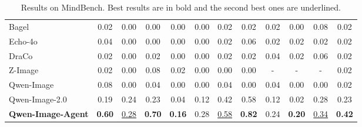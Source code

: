 \begin{table}[t]
{\begin{tabular}{l|ccccc|ccccc|c}
Bagel~\citep{deng2025bagel}                    & 0.02 & 0.00 & 0.00 & 0.00 & 0.00 & 0.02 & 0.02 & 0.02 & 0.00 & 0.08 & 0.02 \\
Echo-4o~\citep{ye2025echo}                     & 0.04 & 0.00 & 0.00 & 0.00 & 0.00 & 0.02 & 0.06 & 0.02 & 0.02 & 0.02 & 0.02 \\
DraCo~\citep{jiang2025draco}                   & 0.02 & 0.00 & 0.02 & 0.00 & 0.00 & 0.02 & 0.02 & 0.04 & 0.02 & 0.06 & 0.02 \\
Z-Image~\citep{cai2025z}                       & 0.02 & 0.00 & 0.08 & 0.02 & 0.00 & 0.00 & 0.00 & - & - & - & 0.02 \\
Qwen-Image~\citep{wu2025qwen}                  & 0.08 & 0.00 & 0.04 & 0.00 & 0.00 & 0.04 & 0.00 & 0.04 & 0.00 & 0.00 & 0.02 \\
Qwen-Image-2.0~\citep{Zhao2026QwenImage20TR}   & 0.19 & 0.24 & 0.23 & 0.04 & 0.12 & 0.42 & 0.58 & 0.12 & 0.02 & 0.28 & 0.23 \\
\midrule
\rowcolor{blue!10}
\textbf{Qwen-Image-Agent} & \textbf{0.60} & \underline{0.28} & \textbf{0.70} & \textbf{0.16} & 0.28 & \underline{0.58} & \textbf{0.82} & 0.24 & \textbf{0.20} & \underline{0.34} & \textbf{0.42} \\
\bottomrule
\end{tabular}
}
\caption{Results on MindBench. Best results are in bold and the second best ones are underlined.}
\label{tab:mindbench}
\end{table}
